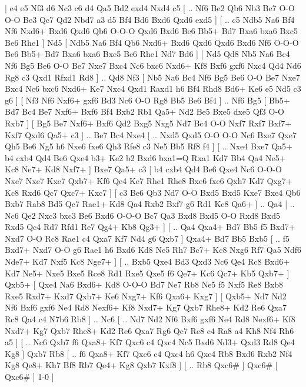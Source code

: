 \makegametitle 
|   e4   e5    Nf3   d6    Nc3   c6    d4   Qa5    Bd2   exd4    Nxd4   c5 [ .. Nf6  Be2 Qb6  Nb3 Be7  O-O O-O  Be3 Qc7  Qd2 Nbd7  a3 d5  Bf4 Bd6  Bxd6 Qxd6  exd5   ]  [ .. c5  Ndb5 Na6  Bf4 Nf6  Nxd6+ Bxd6  Qxd6 Qb6  O-O-O Qxd6  Bxd6 Be6  Bb5+ Bd7  Bxa6 bxa6  Bxc5 Be6  Rhe1   ]  Nd5 [  Ndb5 Na6  Bf4 Qb6  Nxd6+ Bxd6  Qxd6 Qxd6  Bxd6 Nf6  O-O-O Be6  Bb5+ Bd7  Bxa6 bxa6  Bxc5 Be6  Rhe1 Nd7  Bd6   ]  [  Nd5 Qd8  Nb5 Na6  Bc4 Nf6  Bg5 Be6  O-O Be7  Nxe7 Bxc4  Nc6 bxc6  Nxd6+ Kf8  Bxf6 gxf6  Nxc4 Qd4  Nd6 Rg8  c3 Qxd1  Rfxd1 Rd8   ] .. Qd8    Nf3 [  Nb5 Na6  Bc4 Nf6  Bg5 Be6  O-O Be7  Nxe7 Bxc4  Nc6 bxc6  Nxd6+ Ke7  Nxc4 Qxd1  Raxd1 h6  Bf4 Rhd8  Bd6+ Ke6  e5 Nd5  c3 g6   ]  [  Nf3 Nf6  Nxf6+ gxf6  Bd3 Nc6  O-O Rg8  Bb5 Be6  Bf4   ] .. Nf6    Bg5 [  Bb5+ Bd7  Bc4 Be7  Nxf6+ Bxf6  Bf4 Bxb2  Rb1 Qa5+  Nd2 Be5  Bxe5 dxe5  Qf3 O-O  Rxb7   ]  [  Bg5 Be7  Nxf6+ Bxf6  Qd2 Bxg5  Nxg5 Nd7  Bc4 O-O  Nxf7 Rxf7  Bxf7+ Kxf7  Qxd6 Qa5+  c3   ] .. Be7    Bc4   Nxe4 [ .. Nxd5  Qxd5 O-O  O-O Nc6  Bxe7 Qxe7  Qh5 Be6  Ng5 h6  Nxe6 fxe6  Qh3 Rfe8  c3 Ne5  Bb5 Rf8  f4   ]  [ .. Nxe4  Bxe7 Qa5+  b4 cxb4  Qd4 Be6  Qxe4 b3+  Ke2 b2  Bxd6 bxa1=Q  Rxa1 Kd7  Bb4 Qa4  Ne5+ Kc8  Ne7+ Kd8  Nxf7+   ]  Bxe7   Qa5+    c3 [  b4 cxb4  Qd4 Be6  Qxe4 Nc6  O-O-O Nxe7  Nxe7 Kxe7  Qxb7+ Kf6  Qe4 Ke7  Rhe1 Rhe8  Bxe6 fxe6  Qxh7 Kd7  Qxg7+ Kc8  Rxd6 Qc7  Qxc7+ Kxc7   ]  [  c3 Be6  Qb3 Nd7  O-O Bxd5  Bxd5 Kxe7  Bxe4 Qb6  Bxb7 Rab8  Bd5 Qc7  Rae1+ Kd8  Qa4 Rxb2  Bxf7 g6  Rd1 Kc8  Qa6+   ] .. Qa4 [ .. Nc6  Qe2 Nxc3  bxc3 Be6  Bxd6 O-O-O  Bc7 Qa3  Bxd8 Bxd5  O-O Rxd8  Bxd5 Rxd5  Qc4 Rd7  Rfd1 Re7  Qg4+ Kb8  Qg3+   ]  [ .. Qa4  Qxa4+ Bd7  Bb5 f5  Bxd7+ Nxd7  O-O Rc8  Rae1 c4  Qxa7 Kf7  Nd4 g6  Qxb7   ]  Qxa4+   Bd7    Bb5   Bxb5 [ .. f5  Bxd7+ Nxd7  O-O g6  Rae1 h6  Bxd6 Kd8  Ne5 Rh7  Bc7+ Kc8  Nxg6 Rf7  Qa5 Ndf6  Nde7+ Kd7  Nxf5 Kc8  Nge7+   ]  [ .. Bxb5  Qxe4 Bd3  Qxd3 Nc6  Qe4 Rc8  Bxd6+ Kd7  Ne5+ Nxe5  Bxe5 Rce8  Rd1 Rxe5  Qxe5 f6  Qe7+ Kc6  Qc7+ Kb5  Qxb7+   ]  Qxb5+ [  Qxe4 Na6  Bxd6+ Kd8  O-O-O Bd7  Ne7 Rb8  Ne5 f5  Nxf5 Re8  Bxb8 Rxe5  Rxd7+ Kxd7  Qxb7+ Ke6  Nxg7+ Kf6  Qxa6+ Kxg7   ]  [  Qxb5+ Nd7  Nd2 Nf6  Bxf6 gxf6  Ne4 Rd8  Nexf6+ Kf8  Nxd7+ Kg7  Qxb7 Rhe8+  Kd2 Re6  Qxa7 Rc8  Qa4 c4  N7b6 Rb8   ] .. Nc6 [ .. Nd7  Nd2 Nf6  Bxf6 gxf6  Ne4 Rd8  Nexf6+ Kf8  Nxd7+ Kg7  Qxb7 Rhe8+  Kd2 Re6  Qxa7 Rg6  Qc7 Re8  c4 Ra8  a4 Kh8  Nf4 Rh6  a5   ]  [ .. Nc6  Qxb7 f6  Qxa8+ Kf7  Qxc6 c4  Qxc4 Nc5  Bxd6 Nd3+  Qxd3 Rd8  Qe4 Kg8   ]  Qxb7   Rb8 [ .. f6  Qxa8+ Kf7  Qxc6 c4  Qxc4 h6  Qxe4 Rb8  Bxd6 Rxb2  Nf4 Kg8  Qe8+ Kh7  Bf8 Rb7  Qe4+ Kg8  Qxb7 Kxf8   ]  [ .. Rb8  Qxc6#   ]  Qxc6#    [  Qxc6#   ] 1-0  |
